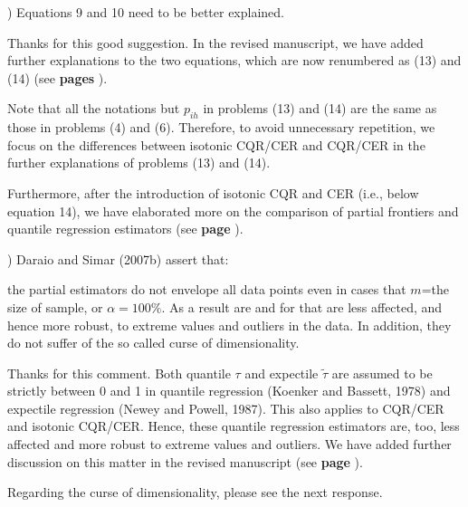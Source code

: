 \documentclass[12pt]{article}
\newcommand{\np}{\vskip 0.3cm}
\begin{document}

\np
\np
\np
\begin{sf}
{) Equations 9 and 10 need to be better explained.}
\end{sf}
\begin{response}
Thanks for this good suggestion. In the revised manuscript, we have added further explanations to the two equations, which are now renumbered as (13) and (14) (see \textbf{pages} ).\np

Note that all the notations but $p_{ih}$ in problems (13) and (14) are the same as those in problems (4) and (6). Therefore, to avoid unnecessary repetition, we focus on the differences between isotonic CQR/CER and CQR/CER in the further explanations of problems (13) and (14). \np

Furthermore, after the introduction of isotonic CQR and CER (i.e., below equation 14), we have elaborated more on the comparison of partial frontiers and quantile regression estimators (see \textbf{page }).

\end{response}


\np
\np
\np
\begin{sf}
{) Daraio and Simar (2007b) assert that:\np

the partial estimators do not envelope all data points even in cases that $m$=the size of sample, or $\alpha=100\%$. As a result are and for that are less affected, and hence more robust, to extreme values and outliers in the data. In addition, they do not suffer of the so called curse of dimensionality.}
\end{sf}
\begin{response}
Thanks for this comment. Both quantile $\tau$ and expectile $\tilde{\tau}$ are assumed to be strictly between 0 and 1 in quantile regression (Koenker and Bassett, 1978) and expectile regression (Newey and Powell, 1987). This also applies to CQR/CER and isotonic CQR/CER. Hence, these quantile regression estimators are, too, less affected and more robust to extreme values and outliers. We have added further discussion on this matter in the revised manuscript (see \textbf{page} ). \np

Regarding the curse of dimensionality, please see the next response. 
\end{response}

\end{document}
